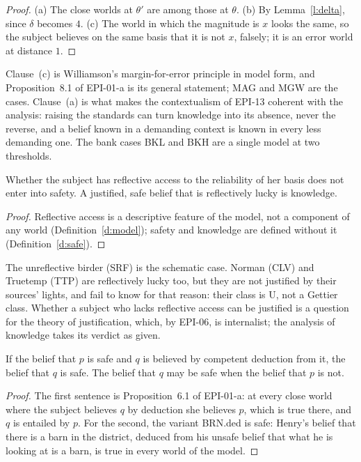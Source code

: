 \documentclass{situationist-preprint}
\begin{document}
\begin{proof}
(a) The close worlds at $\theta'$ are among those at $\theta$. (b) By Lemma~\ref{l:delta}, since $\delta$ becomes $4$. (c) The world in which the magnitude is $x$ looks the same, so the subject believes on the same basis that it is not $x$, falsely; it is an error world at distance $1$.
\end{proof}

Clause~(c) is Williamson's margin-for-error principle in model form, and Proposition~8.1 of EPI-01-a is its general statement; MAG and MGW are the cases. Clause~(a) is what makes the contextualism of EPI-13 coherent with the analysis: raising the standards can turn knowledge into its absence, never the reverse, and a belief known in a demanding context is known in every less demanding one. The bank cases BKL and BKH are a single model at two thresholds.

\begin{proposition}\label{p:reflective}
Whether the subject has reflective access to the reliability of her basis does not enter into safety. A justified, safe belief that is reflectively lucky is knowledge.
\end{proposition}

\begin{proof}
Reflective access is a descriptive feature of the model, not a component of any world (Definition~\ref{d:model}); safety and knowledge are defined without it (Definition~\ref{d:safe}).
\end{proof}

The unreflective birder (SRF) is the schematic case. Norman (CLV) and Truetemp (TTP) are reflectively lucky too, but they are not justified by their sources' lights, and fail to know for that reason: their class is U, not a Gettier class. Whether a subject who lacks reflective access can be justified is a question for the theory of justification, which, by EPI-06, is internalist; the analysis of knowledge takes its verdict as given.

\begin{proposition}[Deduction]\label{p:deduction}
If the belief that $p$ is safe and $q$ is believed by competent deduction from it, the belief that $q$ is safe. The belief that $q$ may be safe when the belief that $p$ is not.
\end{proposition}

\begin{proof}
The first sentence is Proposition~6.1 of EPI-01-a: at every close world where the subject believes $q$ by deduction she believes $p$, which is true there, and $q$ is entailed by $p$. For the second, the variant BRN.ded is safe: Henry's belief that there is a barn in the district, deduced from his unsafe belief that what he is looking at is a barn, is true in every world of the model.
\end{proof}
\end{document}
